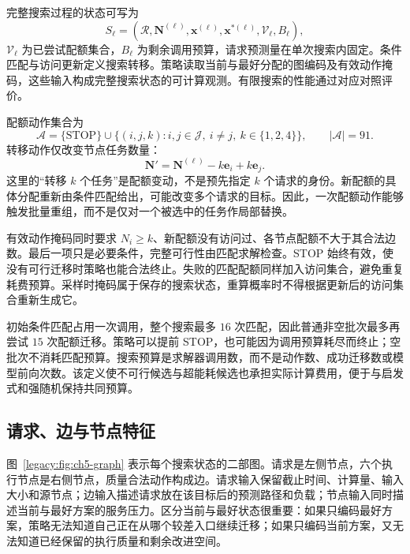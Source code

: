 完整搜索过程的状态可写为
\begin{equation}
 S_\ell=(\mathcal R,\mathbf N^{(\ell)},\mathbf x^{(\ell)},\mathbf x^{*(\ell)},\mathcal V_\ell,B_\ell),
 \label{legacy:eq:ch5-full-search-state}
\end{equation}
$\mathcal V_\ell$ 为已尝试配额集合，$B_\ell$ 为剩余调用预算，请求预测量在单次搜索内固定。条件匹配与访问更新定义搜索转移。策略读取当前与最好分配的图编码及有效动作掩码，这些输入构成完整搜索状态的可计算观测。有限搜索的性能通过对应对照评价。

配额动作集合为
\begin{equation}
 \mathcal A=\{\mathrm{STOP}\}\cup
 \{(i,j,k):i,j\in\mathcal J,\ i\ne j,\ k\in\{1,2,4\}\},
 \qquad |\mathcal A|=91.
 \label{legacy:eq:ch5-action-space}
\end{equation}
转移动作仅改变节点任务数量：
\begin{equation}
 \mathbf N'=\mathbf N^{(\ell)}-k\mathbf e_i+k\mathbf e_j.
 \label{legacy:eq:ch5-quota-transfer}
\end{equation}
这里的“转移 $k$ 个任务”是配额变动，不是预先指定 $k$ 个请求的身份。新配额的具体分配重新由条件匹配给出，可能改变多个请求的目标。因此，一次配额动作能够触发批量重组，而不是仅对一个被选中的任务作局部替换。

有效动作掩码同时要求 $N_i\ge k$、新配额没有访问过、各节点配额不大于其合法边数。最后一项只是必要条件，完整可行性由匹配求解检查。STOP 始终有效，使没有可行迁移时策略也能合法终止。失败的匹配配额同样加入访问集合，避免重复耗费预算。采样时掩码属于保存的搜索状态，重算概率时不得根据更新后的访问集合重新生成它。

初始条件匹配占用一次调用，整个搜索最多 $16$ 次匹配，因此普通非空批次最多再尝试 $15$ 次配额迁移。策略可以提前 STOP，也可能因为调用预算耗尽而终止；空批次不消耗匹配预算。搜索预算是求解器调用数，而不是动作数、成功迁移数或模型前向次数。该定义使不可行候选与超能耗候选也承担实际计算费用，便于与启发式和强随机保持共同预算。

\subsection{请求、边与节点特征}

图~\ref{legacy:fig:ch5-graph} 表示每个搜索状态的二部图。请求是左侧节点，六个执行节点是右侧节点，质量合法动作构成边。请求输入保留截止时间、计算量、输入大小和源节点；边输入描述请求放在该目标后的预测路径和负载；节点输入同时描述当前与最好方案的服务压力。区分当前与最好状态很重要：如果只编码最好方案，策略无法知道自己正在从哪个较差入口继续迁移；如果只编码当前方案，又无法知道已经保留的执行质量和剩余改进空间。

